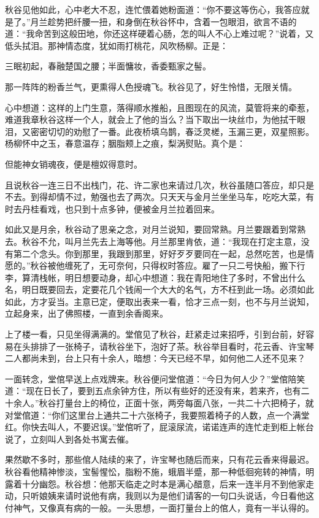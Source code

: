 \documentclass[12pt,UTF8]{ctexbook}
\begin{document}
{{{秋谷见他如此，心中老大不忍，连忙偎着她粉面道：“你不要这等伤心，我答应就是了。”月兰趁势把纤腰一扭，和身倒在秋谷怀中，含着一包眼泪，欲言不语的道：“我命苦到这般田地，你还这样硬着心肠，怎的叫人不心上难过呢？”说着，又低头拭泪。那神情态度，犹如雨打桃花，风吹杨柳。正是：

三眠初起，春融楚国之腰；半面慵妆，香委甄家之髻。

那一阵阵的粉香兰气，更熏得人色授魂飞。秋谷见了，好生怜惜，无限关情。

心中想道：这样的上门生意，落得顺水推船，且图现在的风流，莫管将来的牵惹，难道我章秋谷这样一个人，就会上了他的当么？当下取出一块丝巾，为他拭干眼泪，又密密切切的劝慰了一番。此夜桥填乌鹊，春泛灵槎，玉漏三更，双星照影。杨柳怀中之玉，春意温存；胭脂颊上之痕，梨涡熨贴。真个是：

但能神女销魂夜，便是檀奴得意时。

且说秋谷一连三日不出栈门，花、许二家也来请过几次，秋谷虽随口答应，却只是不去。到得却情不过，勉强也去了两次。只天天与金月兰坐坐马车，吃吃大菜，有时去丹桂看戏，也只到十点多钟，便被金月兰拉着回来。

如此又是月余，秋谷动了思亲之念，对月兰说知，要回常熟。月兰要跟着到常熟去。秋谷不允，叫月兰先去上海等他。月兰那里肯依，道：“我现在打定主意，没有第二个念头。你到那里，我跟到那里，好好歹歹要同在一起，总然吃苦，也是情愿的。”秋谷被他缠死了，无可奈何，只得权时答应。雇了一只二号快船，搬下行李，算清栈帐，明日想要动身，却心中想道：我在青阳地住了多时，不曾出什么名，明日既要回去，定要花几个钱闹一个大大的名气，方不枉到此一场。必须如此如此，方才妥当。主意已定，便取出表来一看，恰才三点一刻，也不与月兰说知，立起身来，出了佛照楼，一直到余香阁来。

上了楼一看，只见坐得满满的。堂倌见了秋谷，赶紧走过来招呼，引到台前，好容易在头排排了一张椅子，请秋谷坐下，泡好了茶。秋谷举目看时，花云香、许宝琴二人都尚未到，台上只有十余人，暗想：今天已经不早，如何他二人还不见来？

一面转念，堂倌早送上点戏牌来。秋谷便问堂倌道：“今日为何人少？”堂倌陪笑道：“现在日长了，要到五点余钟方住，所以有些好的还没有来，若来齐，也有二十余人。”秋谷打量台上的椅位，正面十张，两旁每面八张，一共二十六把椅子，就对堂倌道：“你们这里台上通共二十六张椅子，我要照着椅子的人数，点一个满堂红。你快去叫人，不要迟误。”堂倌听了，屁滚尿流，诺诺连声的连忙走到柜上帐台说了，立刻叫人到各处书寓去催。

果然歇不多时，那些倌人陆续的来了，许宝琴也随后而来，只有花云香来得最迟。秋谷看他精神惨淡，宝髻惺忪，脂粉不施，蛾眉半蹙，那一种低徊宛转的神情，明露着十分幽怨。秋谷想：他那天临走之时本是满心醋意，后来一连半月不到他家走动，只听娘姨来请时说他有病，我则以为是他们请客的一句口头说话，今日看他这付神气，又像真有病的一般。一头思想，一面打量台上的倌人，竟有一半认得的。

}}}
\end{document}
